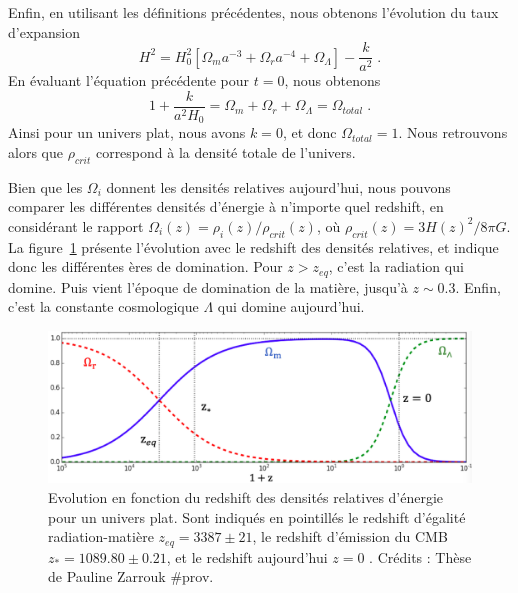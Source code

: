 \documentclass[11pt, twoside, a4paper, openright]{report}
\begin{document}
Enfin, en utilisant les définitions précédentes, nous obtenons l'évolution du taux d'expansion
\begin{equation}
  \label{eq:friedmann7}
  H^2 = H_0^2 \left[\Omega_m a^{-3} + \Omega_r a^{-4} + \Omega_{\Lambda} \right] - \frac{k}{a^{2}}  \; .
\end{equation}
En évaluant l'équation précédente pour $t=0$, nous obtenons
\begin{equation}
  \label{eq:sum_omega}
 1 + \frac{k}{a^{2} H_{0}}  =  \Omega_m + \Omega_r + \Omega_{\Lambda} = \Omega_{total}  \; .
\end{equation}
Ainsi pour un univers plat, nous avons $k = 0$, et donc $\Omega_{total} = 1$. Nous retrouvons alors que $\rho_{crit}$ correspond à la densité totale de l'univers. 

Bien que les $\Omega_i$ donnent les densités relatives aujourd'hui, nous pouvons comparer les différentes densités d'énergie à n'importe quel redshift, en considérant le rapport $\Omega_{i}(z) = \rho_{i}(z) / \rho_{crit}(z)$, où $\rho_{crit}(z) = 3H(z)^{2} / 8 \pi G$. La figure~\ref{fig:evol_omega} présente l'évolution  avec le redshift des densités relatives, et indique donc les différentes ères de domination. Pour $z > z_{eq}$, c'est la radiation qui domine. Puis vient l'époque de domination de la matière, jusqu'à $z \sim \num{0.3}$. Enfin, c'est la constante cosmologique $\Lambda$ qui domine aujourd'hui.
\begin{figure}
  \centering
  \includegraphics[scale=0.4]{evol_omega}
  \caption{Evolution en fonction du redshift des densités relatives d'énergie pour un univers plat. Sont indiqués en pointillés le redshift d'égalité radiation-matière $z_{eq} = 3387 \pm 21$, le redshift d'émission du CMB $z_{\ast} = \num{1089.80} \pm \num{0.21}$, et le redshift aujourd'hui $z = 0$ \autocite{Collaboration2018}. Crédits : Thèse de Pauline Zarrouk \#prov.}
\label{fig:evol_omega}
\end{figure}
\end{document}

